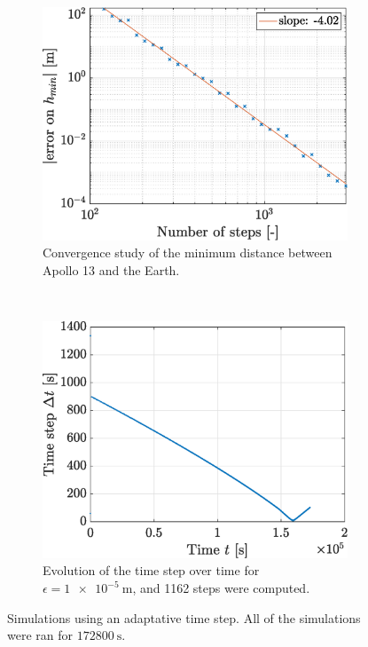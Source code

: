 \documentclass[a4paper,12pt,twoside]{article}
\begin{document}
\begin{figure}[h]
  \centering
  \begin{subfigure}[t]{0.45\textwidth}
    \includegraphics[width=\textwidth]{graphs/ex1c_conveps_h.eps}
    \caption{Convergence study of the minimum distance between Apollo 13 and the Earth.}
    \label{fig:1c_conveps_h}
  \end{subfigure}
  ~
  \begin{subfigure}[t]{0.45\textwidth}
    \includegraphics[width=\textwidth]{graphs/ex1c_conveps_dt.eps}
    \caption{Evolution of the time step over time for $\epsilon=\SI{1e-5}{\m}$, and \num{1162} steps were computed.}
    \label{fig:1c_conveps_dt}
  \end{subfigure}
  \caption{Simulations using an adaptative time step. All of the simulations were ran for $\SI{172800}{\s}$.}
  \label{fig:1c_conveps}
\end{figure}
\end{document}
